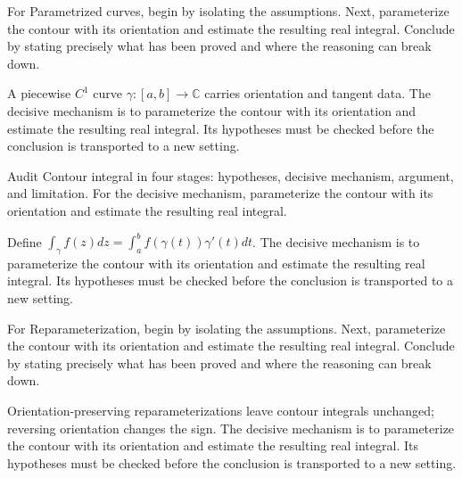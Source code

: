 \begin{problem}\label{prob:iv04-problem-01}
For Parametrized curves, begin by isolating the assumptions. Next, parameterize the contour with its orientation and estimate the resulting real integral. Conclude by stating precisely what has been proved and where the reasoning can break down.
\end{problem}
\begin{solution}
A piecewise $C^1$ curve $\gamma:[a,b]\to\mathbb C$ carries orientation and tangent data. The decisive mechanism is to parameterize the contour with its orientation and estimate the resulting real integral. Its hypotheses must be checked before the conclusion is transported to a new setting.
\end{solution}

\begin{problem}\label{prob:iv04-problem-02}
Audit Contour integral in four stages: hypotheses, decisive mechanism, argument, and limitation. For the decisive mechanism, parameterize the contour with its orientation and estimate the resulting real integral.
\end{problem}
\begin{solution}
Define $\int_\gamma f(z)dz=\int_a^bf(\gamma(t))\gamma'(t)dt$. The decisive mechanism is to parameterize the contour with its orientation and estimate the resulting real integral. Its hypotheses must be checked before the conclusion is transported to a new setting.
\end{solution}

\begin{problem}\label{prob:iv04-problem-03}
For Reparameterization, begin by isolating the assumptions. Next, parameterize the contour with its orientation and estimate the resulting real integral. Conclude by stating precisely what has been proved and where the reasoning can break down.
\end{problem}
\begin{solution}
Orientation-preserving reparameterizations leave contour integrals unchanged; reversing orientation changes the sign. The decisive mechanism is to parameterize the contour with its orientation and estimate the resulting real integral. Its hypotheses must be checked before the conclusion is transported to a new setting.
\end{solution}

